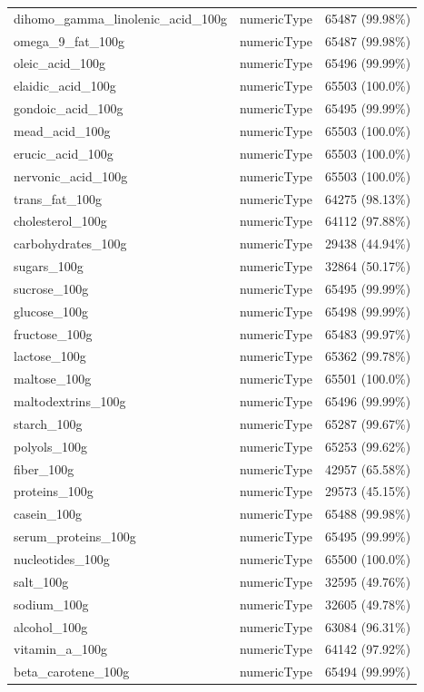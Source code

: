 \documentclass[11pt]{article}
\begin{document}
\begin{center}
\begin{longtable}{|l|c|r|}
dihomo\_gamma\_linolenic\_acid\_100g& numericType& 65487 (99.98\%)\\
omega\_9\_fat\_100g& numericType& 65487 (99.98\%)\\
oleic\_acid\_100g& numericType& 65496 (99.99\%)\\
elaidic\_acid\_100g& numericType& 65503 (100.0\%)\\
gondoic\_acid\_100g& numericType& 65495 (99.99\%)\\
mead\_acid\_100g& numericType& 65503 (100.0\%)\\
erucic\_acid\_100g& numericType& 65503 (100.0\%)\\
nervonic\_acid\_100g& numericType& 65503 (100.0\%)\\
trans\_fat\_100g& numericType& 64275 (98.13\%)\\
cholesterol\_100g& numericType& 64112 (97.88\%)\\
carbohydrates\_100g& numericType& 29438 (44.94\%)\\
sugars\_100g& numericType& 32864 (50.17\%)\\
sucrose\_100g& numericType& 65495 (99.99\%)\\
glucose\_100g& numericType& 65498 (99.99\%)\\
fructose\_100g& numericType& 65483 (99.97\%)\\
lactose\_100g& numericType& 65362 (99.78\%)\\
maltose\_100g& numericType& 65501 (100.0\%)\\
maltodextrins\_100g& numericType& 65496 (99.99\%)\\
starch\_100g& numericType& 65287 (99.67\%)\\
polyols\_100g& numericType& 65253 (99.62\%)\\
fiber\_100g& numericType& 42957 (65.58\%)\\
proteins\_100g& numericType& 29573 (45.15\%)\\
casein\_100g& numericType& 65488 (99.98\%)\\
serum\_proteins\_100g& numericType& 65495 (99.99\%)\\
nucleotides\_100g& numericType& 65500 (100.0\%)\\
salt\_100g& numericType& 32595 (49.76\%)\\
sodium\_100g& numericType& 32605 (49.78\%)\\
alcohol\_100g& numericType& 63084 (96.31\%)\\
vitamin\_a\_100g& numericType& 64142 (97.92\%)\\
beta\_carotene\_100g& numericType& 65494 (99.99\%)\\

\end{longtable}
\end{center}
\end{document}
